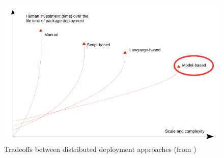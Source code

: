 \begin{figure}
	\centering
	\includegraphics[width=1\columnwidth]{chapters/Deployment.images/TradeoffsDeployment.pdf}
	\caption{Tradeoffs between distributed deployment approaches (from \cite{talwar2005approaches})}
	\label{fig:tradeoffsDeployment}
\end{figure}

